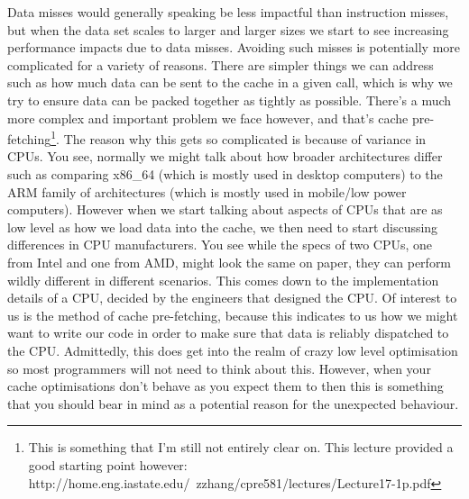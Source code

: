 \documentclass{article}
\begin{document}
Data misses would generally speaking be less impactful than instruction misses,
but when the data set scales to larger and larger sizes we start to see
increasing performance impacts due to data misses. Avoiding such misses is
potentially more complicated for a variety of reasons. There are simpler things
we can address such as how much data can be sent to the cache in a given call,
which is why we try to ensure data can be packed together as tightly as
possible. There's a much more complex and important problem we face however,
and that's cache
pre-fetching\footnote{This is something that I'm still not entirely clear on. This lecture provided a good starting point however: http://home.eng.iastate.edu/~zzhang/cpre581/lectures/Lecture17-1p.pdf}.
The reason why this gets so complicated is because of variance in CPUs. You see,
normally we might talk about how broader architectures differ such as comparing
x86\_64 (which is mostly used in desktop computers) to the ARM family of
architectures (which is mostly used in mobile/low power computers). However when
we start talking about aspects of CPUs that are as low level as how we load data
into the cache, we then need to start discussing differences in CPU
manufacturers. You see while the specs of two CPUs, one from Intel and one from
AMD, might look the same on paper, they can perform wildly different in
different scenarios. This comes down to the implementation details of a CPU,
decided by the engineers that designed the CPU. Of interest to us is the
method of cache pre-fetching, because this indicates to us how we might want
to write our code in order to make sure that data is reliably dispatched to the
CPU. Admittedly, this does get into the realm of crazy low level optimisation
so most programmers will not need to think about this. However, when your
cache optimisations don't behave as you expect them to then this is something
that you should bear in mind as a potential reason for the unexpected behaviour.
\end{document}
